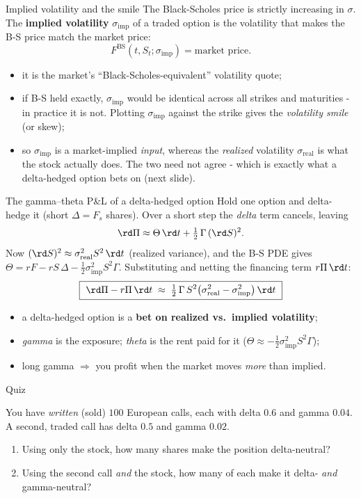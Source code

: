 \documentclass[pdf, handout]{beamer}
\begin{document}
\begin{frame}{Implied volatility and the smile}
The Black-Scholes price is strictly increasing in $\sigma$. The \textbf{implied volatility} $\sigma_{\text{imp}}$ of a traded option is the volatility that makes the B-S price match the market price:
\[ F^{\text{BS}}(t,S_t;\sigma_{\text{imp}})=\text{market price}. \]
\begin{itemize}
\item it is the market's ``Black-Scholes-equivalent'' volatility quote;
\item if B-S held exactly, $\sigma_{\text{imp}}$ would be identical across all strikes and maturities - in practice it is not. Plotting $\sigma_{\text{imp}}$ against the strike gives the \emph{volatility smile} (or skew);
\item so $\sigma_{\text{imp}}$ is a market-implied \emph{input}, whereas the \emph{realized} volatility $\sigma_{\text{real}}$ is what the stock actually does. The two need not agree - which is exactly what a delta-hedged option bets on (next slide).
\end{itemize}
\end{frame}

\begin{frame}{The gamma--theta P\&L of a delta-hedged option}
Hold one option and delta-hedge it (short $\Delta=F_s$ shares). Over a short step the \emph{delta} term cancels, leaving
\[ \rd\Pi \approx \Theta\,\rd t + \tfrac12\,\Gamma\,(\rd S)^2 . \]
Now $(\rd S)^2\approx \sigma_{\text{real}}^2 S^2\,\rd t$ (realized variance), and the B-S PDE gives $\Theta = rF - rS\,\Delta - \tfrac12\sigma_{\text{imp}}^2 S^2\Gamma$. Substituting and netting the financing term $r\Pi\,\rd t$:
\[ \boxed{\ \rd\Pi - r\Pi\,\rd t \;\approx\; \tfrac12\,\Gamma\,S^2\big(\sigma_{\text{real}}^2-\sigma_{\text{imp}}^2\big)\,\rd t\ } \]
\begin{itemize}
\item a delta-hedged option is a \textbf{bet on realized vs.\ implied volatility};
\item \emph{gamma} is the exposure; \emph{theta} is the rent paid for it ($\Theta\approx-\tfrac12\sigma_{\text{imp}}^2 S^2\Gamma$);
\item long gamma $\Rightarrow$ you profit when the market moves \emph{more} than implied.
\end{itemize}
\end{frame}

\begin{frame}{Quiz}
\begin{quizbox}
You have \emph{written} (sold) $100$ European calls, each with delta $0.6$ and gamma $0.04$. A second, traded call has delta $0.5$ and gamma $0.02$.
\begin{enumerate}
\item Using only the stock, how many shares make the position delta-neutral?
\item Using the second call \emph{and} the stock, how many of each make it delta- \emph{and} gamma-neutral?
\end{enumerate}
\end{quizbox}
\end{frame}
\end{document}
